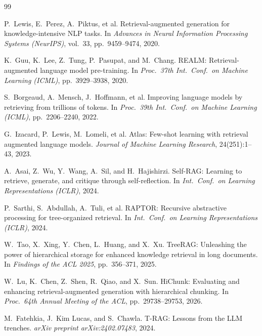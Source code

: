 \documentclass[12pt,a4paper,twoside,openright]{report}
\makeatletter
\def\cleardoublepage{\clearpage\if@twoside
  \ifodd\c@page\else
    \hbox{}\thispagestyle{empty}\newpage
    \if@twocolumn\hbox{}\newpage\fi
  \fi\fi}
\makeatother
\begin{document}
\cleardoublepage
\renewcommand{\bibname}{REFERENCES}
{}
\begin{thebibliography}{99}

P.~Lewis, E.~Perez, A.~Piktus, et al.
Retrieval-augmented generation for knowledge-intensive NLP tasks.
In \textit{Advances in Neural Information Processing Systems (NeurIPS)}, vol.~33,
pp.~9459--9474, 2020.

K.~Guu, K.~Lee, Z.~Tung, P.~Pasupat, and M.~Chang.
REALM: Retrieval-augmented language model pre-training.
In \textit{Proc.\ 37th Int.\ Conf.\ on Machine Learning (ICML)}, pp.~3929--3938, 2020.

S.~Borgeaud, A.~Mensch, J.~Hoffmann, et al.
Improving language models by retrieving from trillions of tokens.
In \textit{Proc.\ 39th Int.\ Conf.\ on Machine Learning (ICML)}, pp.~2206--2240, 2022.

G.~Izacard, P.~Lewis, M.~Lomeli, et al.
Atlas: Few-shot learning with retrieval augmented language models.
\textit{Journal of Machine Learning Research}, 24(251):1--43, 2023.

A.~Asai, Z.~Wu, Y.~Wang, A.~Sil, and H.~Hajishirzi.
Self-RAG: Learning to retrieve, generate, and critique through self-reflection.
In \textit{Int.\ Conf.\ on Learning Representations (ICLR)}, 2024.

P.~Sarthi, S.~Abdullah, A.~Tuli, et al.
RAPTOR: Recursive abstractive processing for tree-organized retrieval.
In \textit{Int.\ Conf.\ on Learning Representations (ICLR)}, 2024.

W.~Tao, X.~Xing, Y.~Chen, L.~Huang, and X.~Xu.
TreeRAG: Unleashing the power of hierarchical storage for enhanced knowledge retrieval
in long documents.
In \textit{Findings of the ACL 2025}, pp.~356--371, 2025.

W.~Lu, K.~Chen, Z.~Shen, R.~Qiao, and X.~Sun.
HiChunk: Evaluating and enhancing retrieval-augmented generation with hierarchical
chunking.
In \textit{Proc.\ 64th Annual Meeting of the ACL}, pp.~29738--29753, 2026.

M.~Fatehkia, J.~Kim Lucas, and S.~Chawla.
T-RAG: Lessons from the LLM trenches.
\textit{arXiv preprint arXiv:2402.07483}, 2024.


\end{thebibliography}
\end{document}

